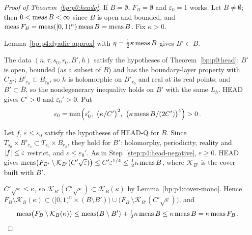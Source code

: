 \begin{proof}[Proof of Theorem~\ref{bp:p0:headq}]
\label{step:p4:hq-trivial}
If $B=\emptyset$, $F_B=\emptyset$ and $\varepsilon_0=1$ works. Let $B\ne\emptyset$; then
$0<\operatorname{meas} B<\infty$ since $B$ is open and bounded, and $\operatorname{meas} F_B=\operatorname{meas}([0,1)^n)\operatorname{meas} B=\operatorname{meas} B$.
Fix $\kappa>0$.

\label{step:p4:hq-approx}
Lemma~\ref{bp:p4:dyadic-approx} with $\eta=\frac12\kappa\operatorname{meas} B$ gives $B'\subset B$.

\label{step:p4:hq-head}
The data $(n,\tau,s_0,r_0,B',h)$ satisfy the hypotheses of Theorem~\ref{bp:p0:head}: $B'$ is open,
bounded (as a subset of $B$) and has the boundary-layer property with $C_{B'}$; $B'_{r_0}\subset B_{r_0}$,
so $h$ is holomorphic on $B'_{r_0}$ and real at its real points; and
$\overline{B'}\subset\bar B$, so the nondegeneracy inequality holds on $\overline{B'}$ with the same
$L_h$. HEAD gives $C'>0$ and $\varepsilon_0'>0$. Put
\begin{equation*}
\varepsilon_0=\min\Bigl(\varepsilon_0',\ \bigl(\kappa/C'\bigr)^2,\ \bigl(\kappa\meas B/(2C')\bigr)^4\Bigr)>0\,.
\end{equation*}

\label{step:p4:hq-transfer}
Let $f$, $\varepsilon\le\varepsilon_0$ satisfy the hypotheses of HEAD-Q for $B$. Since
$T_{s_0}\times B'_{r_0}\subset T_{s_0}\times B_{r_0}$, they hold for $B'$: holomorphy, periodicity,
reality and $\lvert f\rvert\le\varepsilon$ restrict, and $\varepsilon\le\varepsilon_0'$. As in
Step~\ref{step:p4:head-negative}, $\varepsilon\ge0$. HEAD gives
$\operatorname{meas}\bigl(F_{B'}\setminus\mathcal K_{B'}(C'\sqrt\varepsilon)\bigr)\le C'\varepsilon^{1/4}\le\frac12\kappa\operatorname{meas} B$,
where $\mathcal K_{B'}$ is the cover built with $B'$.

\label{step:p4:hq-cover}
$C'\sqrt\varepsilon\le\kappa$, so $\mathcal K_{B'}(C'\sqrt\varepsilon)\subset\mathcal K_B(\kappa)$ by
Lemma~\ref{bp:p4:cover-mono}. Hence
$F_B\setminus\mathcal K_B(\kappa)\subset\bigl([0,1)^n\times(B\setminus B')\bigr)\cup\bigl(F_{B'}\setminus\mathcal K_{B'}(C'\sqrt\varepsilon)\bigr)$,
and
\begin{equation*}
\operatorname{meas}\bigl(F_B\setminus\mathcal K_B(\kappa)\bigr)\le\operatorname{meas}(B\setminus B')+\tfrac12\kappa\operatorname{meas} B\le\kappa\operatorname{meas} B=\kappa\operatorname{meas} F_B\,.
\end{equation*}
\end{proof}

